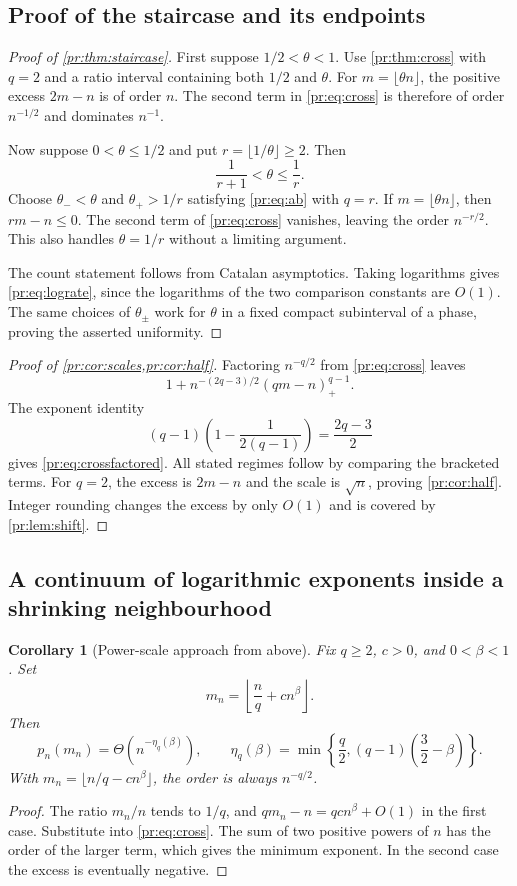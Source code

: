 \documentclass[11pt,a4paper]{article}
\newtheorem{corollary}[corollary]{Corollary}
\theoremstyle{definition}\newaliascnt{definition}{theorem}
\theoremstyle{remark}\newaliascnt{remark}{theorem}
\newcommand{\prpos}[1]{(#1)_+}
\begin{document}
\subsection{Proof of the staircase and its endpoints}
\begin{proof}[Proof of \cref{pr:thm:staircase}]
First suppose $1/2<\theta<1$. Use \cref{pr:thm:cross} with $q=2$ and a ratio
interval containing both $1/2$ and $\theta$. For $m=\lfloor\theta n\rfloor$,
the positive excess $2m-n$ is of order $n$. The second term in
\eqref{pr:eq:cross} is therefore of order $n^{-1/2}$ and dominates $n^{-1}$.

Now suppose $0<\theta\le1/2$ and put $r=\lfloor1/\theta\rfloor\ge2$. Then
\[
 \frac1{r+1}<\theta\le\frac1r.
\]
Choose $\theta_-<\theta$ and $\theta_+>1/r$ satisfying \eqref{pr:eq:ab} with
$q=r$. If $m=\lfloor\theta n\rfloor$, then $rm-n\le0$. The second term of
\eqref{pr:eq:cross} vanishes, leaving the order $n^{-r/2}$. This also handles
$\theta=1/r$ without a limiting argument.

The count statement follows from Catalan asymptotics. Taking logarithms gives
\eqref{pr:eq:lograte}, since the logarithms of the two comparison constants
are $O(1)$. The same choices of $\theta_\pm$ work for $\theta$ in a fixed
compact subinterval of a phase, proving the asserted uniformity.
\end{proof}

\begin{proof}[Proof of \cref{pr:cor:scales,pr:cor:half}]
Factoring $n^{-q/2}$ from \eqref{pr:eq:cross} leaves
\[
 1+n^{-(2q-3)/2}\prpos{qm-n}^{q-1}.
\]
The exponent identity
\[
 (q-1)\left(1-\frac1{2(q-1)}\right)=\frac{2q-3}{2}
\]
gives \eqref{pr:eq:crossfactored}. All stated regimes follow by comparing the
bracketed terms. For $q=2$, the excess is $2m-n$ and the scale is $\sqrt n$,
proving \cref{pr:cor:half}. Integer rounding changes the excess by only
$O(1)$ and is covered by \cref{pr:lem:shift}.
\end{proof}

\subsection{A continuum of logarithmic exponents inside a shrinking neighbourhood}
\begin{corollary}[Power-scale approach from above]\label{pr:cor:powerapproach}
Fix $q\ge2$, $c>0$, and $0<\beta<1$. Set
\[
 m_n=\left\lfloor\frac nq+c n^\beta\right\rfloor.
\]
Then
\begin{equation}
 p_n(m_n)=\Theta\!\left(n^{-\eta_q(\beta)}\right),\qquad
 \eta_q(\beta)=\min\left\{\frac q2,
                     (q-1)\left(\frac32-\beta\right)\right\}.
 \label{pr:eq:powerapproach}
\end{equation}
With $m_n=\lfloor n/q-c n^\beta\rfloor$, the order is always $n^{-q/2}$.
\end{corollary}
\begin{proof}
The ratio $m_n/n$ tends to $1/q$, and $qm_n-n=qc n^\beta+O(1)$ in the first
case. Substitute into \eqref{pr:eq:cross}. The sum of two positive powers of
$n$ has the order of the larger term, which gives the minimum exponent. In
the second case the excess is eventually negative.
\end{proof}
\end{document}
